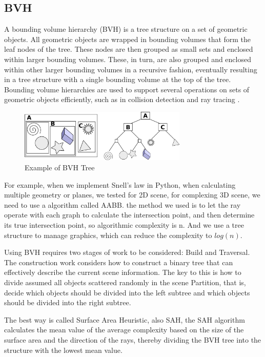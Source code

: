 \documentclass[conference]{IEEEtran}
\begin{document}
\subsection{BVH}
A bounding volume hierarchy (BVH) is a tree structure on a set of geometric objects. 
All geometric objects are wrapped in bounding volumes that form the leaf nodes of the tree. 
These nodes are then grouped as small sets and enclosed within larger bounding volumes. 
These, in turn, are also grouped and enclosed within other larger bounding volumes in a recursive fashion, 
eventually resulting in a tree structure with a single bounding volume at the top of the tree. 
Bounding volume hierarchies are used to support several operations on sets of geometric objects efficiently, 
such as in collision detection and ray tracing \cite{Bounding_volume_hierarchy}.

\begin{figure}[h]
\caption{Example of BVH Tree}
\label{Example of BVH Tree}
\centering 
\includegraphics[width=8cm]{Example_of_bounding_volume_hierarchy_svg.png}
\end{figure}

For example, when we implement Snell's law in Python, when calculating multiple geometry or planes, we tested for 2D scene, for complexing 3D scene, we need to
use a algorithm called AABB. 
the method we used is to let the ray operate with each graph to calculate the intersection point, 
and then determine its true intersection point, so algorithmic complexity is n. And we use a tree structure to manage graphics, 
which can reduce the complexity to $log (n)$.

Using BVH requires two stages of work to be considered: Build and Traversal.
The construction work considers how to construct a binary tree that can effectively describe the current scene information. 
The key to this is how to divide assumed all objects scattered randomly in the scene Partition, that is, 
decide which objects should be divided into the left subtree and which objects should be divided into the right subtree. 
 
The best way is called Surface Area Heuristic, also SAH, the SAH algorithm calculates the mean value of the 
average complexity based on the size of the surface area and the direction of the rays, 
thereby dividing the BVH tree into the structure with the lowest mean value.
\end{document}
